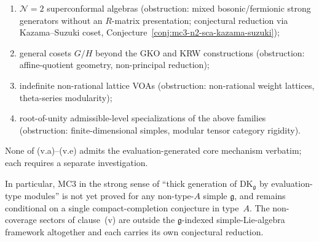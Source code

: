 \begin{theorem}
\begin{enumerate}[label=\textup{(\roman*)},nosep]
\begin{enumerate}[label=\textup{(v.\alph*)},nosep]
\item $\mathcal{N}=2$ superconformal algebras
 \textup{(}obstruction: mixed bosonic/fermionic strong generators
 without an $R$-matrix presentation; conjectural reduction via
 Kazama--Suzuki coset, Conjecture~\ref{conj:mc3-n2-sca-kazama-suzuki}\textup{)};
\item general cosets $G/H$ beyond the GKO and KRW constructions
 \textup{(}obstruction: affine-quotient geometry, non-principal
 reduction\textup{)};
\item indefinite non-rational lattice VOAs
 \textup{(}obstruction: non-rational weight lattices, theta-series
 modularity\textup{)};
\item root-of-unity admissible-level specializations of the above
 families \textup{(}obstruction: finite-dimensional simples,
 modular tensor category rigidity\textup{)}.
\end{enumerate}
 None of (v.a)--(v.e) admits the evaluation-generated core
 mechanism verbatim; each requires a separate investigation.
\end{enumerate}
In particular, MC3 in the strong sense of
``thick generation of $\mathrm{DK}_\mathfrak{g}$ by evaluation-type
modules'' is not yet proved for any non-type-$A$ simple $\mathfrak{g}$,
and remains conditional on a single compact-completion conjecture
in type~$A$. The non-coverage sectors of clause~(v) are
outside the $\mathfrak{g}$-indexed simple-Lie-algebra framework
altogether and each carries its own conjectural reduction.
\end{theorem}

